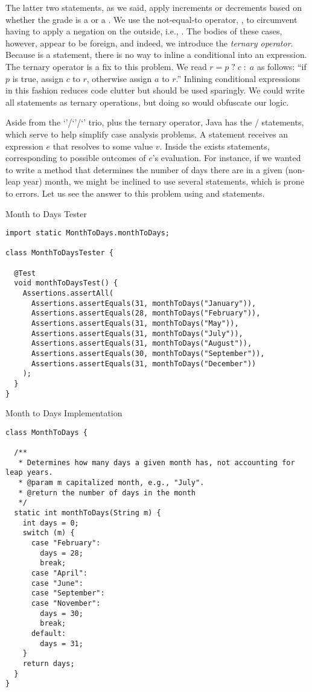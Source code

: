 The latter two  statements, as we said, apply increments or decrements based on whether the grade is a \ttt{+} or a \ttt{-}. We use the not-equal-to operator, \ttt{!=}, to circumvent having to apply a negation on the outside, i.e., . The bodies of these cases, however, appear to be foreign, and indeed, we introduce the \textit{ternary operator}. Because  is a statement, there is no way to inline a conditional into an expression. The ternary operator is a fix to this problem. We read ${r = p\;?\;c\;:\;a}$ as follows: ``if $p$ is true, assign $c$ to $r$, otherwise assign $a$ to $r$.'' Inlining conditional expressions in this fashion reduces code clutter but should be used sparingly. We could write all  statements as ternary operations, but doing so would obfuscate our logic.

Aside from the `'/`'/`' trio, plus the ternary operator, Java has the / statements, which serve to help simplify case analysis problems. A  statement receives an expression $e$ that resolves to some value $v$. Inside the  exists  statements, corresponding to possible outcomes of $e$'s evaluation. For instance, if we wanted to write a method that determines the number of days there are in a given (non-leap year) month, we might be inclined to use several  statements, which is prone to errors. Let us see the answer to this problem using  and  statements.

\begin{cl}[]{Month to Days Tester}
\begin{lstlisting}[language=MyJava]
import static MonthToDays.monthToDays;

class MonthToDaysTester {

  @Test
  void monthToDaysTest() {
    Assertions.assertAll(
      Assertions.assertEquals(31, monthToDays("January")),
      Assertions.assertEquals(28, monthToDays("February")),
      Assertions.assertEquals(31, monthToDays("May")),
      Assertions.assertEquals(31, monthToDays("July")),
      Assertions.assertEquals(31, monthToDays("August")),
      Assertions.assertEquals(30, monthToDays("September")),
      Assertions.assertEquals(31, monthToDays("December"))
    );
  }
}
\end{lstlisting}
\end{cl}

\begin{cl}[]{Month to Days Implementation}
\begin{lstlisting}[language=MyJava]
class MonthToDays {

  /**
   * Determines how many days a given month has, not accounting for leap years.
   * @param m capitalized month, e.g., "July".
   * @return the number of days in the month
   */
  static int monthToDays(String m) {
    int days = 0;
    switch (m) {
      case "February":
        days = 28;
        break;
      case "April":
      case "June":
      case "September":
      case "November":
        days = 30;
        break;
      default:
        days = 31;
    }
    return days;
  }
}
\end{lstlisting}
\end{cl}

